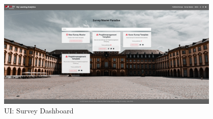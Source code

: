 \begin{figure}[hp]
	\centering
	\includegraphics[width=0.95\textwidth, keepaspectratio]{img/client/SurveyMaster.png}
	\captionsetup{justification=centering, format=plain}
	\caption[\acf{UI}: Survey Dashboard]{\acf{UI}: Survey Dashboard \\ \quelleScreenshot}
	\label{fig:SurveyMasterDashboard}
\end{figure}